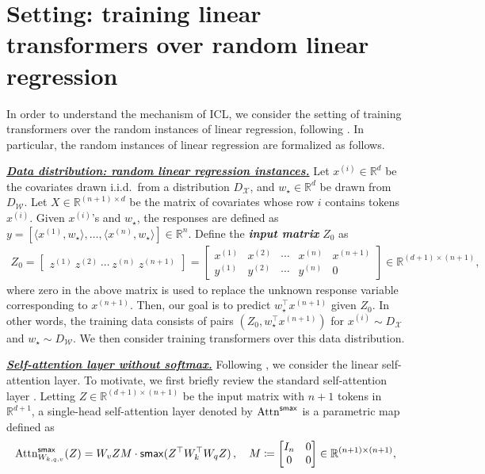 \documentclass{article}
\newcommand{\R}{\mathbb{R}}
\newcommand{\softatt}{ \mathrm{Attn}^{\sf smax}}
\renewcommand{\aa}{M}
\newcommand{\wstar}{w_\star}
\newcommand{\tz}[1]{{z^{(#1)}}}
\newcommand{\tx}[1]{x^{(#1)}}
\newcommand{\ty}[1]{y^{(#1)}}
\newcommand{\emphh}[1]{\textbf{\emph{#1}}}
\begin{document}
 


\section{Setting: training linear transformers over random linear regression}  

\label{sec:problem} 


In order to understand the mechanism of ICL, we consider the setting of training transformers over the random instances of linear regression, following \citep{garg2022can,akyurek2022learning,von2022transformers}.
In particular, the random instances of linear regression are formalized as follows.

\underline{\emphh{Data distribution: random linear regression instances.}}
Let  ${\tx{i}} \in \R^d$  be the covariates drawn i.i.d.\ from a distribution $D_{\mathcal{X}}$, and $\wstar\in \R^d$ be drawn from  $D_{\mathcal{W}}$.
Let $X \in \R^{(n+1)\times d}$ be the matrix of covariates  whose row $i$ contains tokens ${\tx{i}}$.  
Given $\tx{i}$'s and $\wstar$, the responses are defined as $y = [ \langle\tx{1}, \wstar \rangle,\dots,  \langle\tx{n},\wstar \rangle] \in \R^n$. Define the \emphh{input matrix} $Z_0$ as
\begin{align}
\label{d:Z_0}
Z_0 = \begin{bmatrix}
\tz{1} \ \tz{2} \ \cdots \ \tz{n}  \ \tz{n+1}
\end{bmatrix} = \begin{bmatrix}
\tx{1} & \tx{2} & \cdots & \tx{n} &\tx{n+1} \\ 
\ty{1} & \ty{2} & \cdots &\ty{n}& 0
\end{bmatrix} \in \R^{(d+1) \times (n+1)},
\end{align}
where zero in the above matrix is used to replace the unknown response variable corresponding to $\tx{n+1}$.  
Then, our goal is to predict  $\wstar^\top \tx{n+1}$ given $Z_0$. 
In other words, the training data consists of pairs $(Z_0, \wstar^\top \tx{n+1})$ for $\tx{i}\sim D_{\mathcal{X}}$ and 
$\wstar \sim D_{\mathcal{W}}$.
We then consider training transformers over this data distribution.



\underline{\emphh{Self-attention layer without softmax.}}
Following \citep{schlag2021linear,von2022transformers}, we consider the linear self-attention layer.
To motivate, we first briefly review the standard self-attention layer \citep{vaswani2017attention}. Letting  $Z\in \R^{(d+1) \times (n+1)}$ be the input matrix with $n+1$ tokens in $\R^{d+1}$, a single-head self-attention layer denoted by $\softatt$ is a parametric map defined as
\begin{align} \label{eq:softmax}
\softatt_{W_{k,q,v}}(Z) =  W_v Z \aa  \cdot {\sf smax}(Z^\top W_k^\top W_q Z)\,, \quad \aa \coloneqq \begin{bmatrix} I_n & 0 \\0 & 0 \end{bmatrix} \in \R^{(n+1) \times (n+1)},
\end{align}
\end{document}
